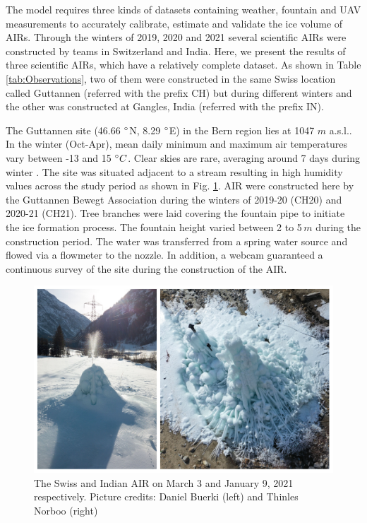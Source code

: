 \documentclass[utf8]{frontiersSCNS} %
\begin{document}
The model requires three kinds of datasets containing weather, fountain and UAV measurements to accurately calibrate,
estimate and validate the ice volume of AIRs. Through the winters of 2019, 2020 and 2021 several scientific AIRs were
constructed by teams in Switzerland and India. Here, we present the results of three scientific AIRs, which have a
relatively complete dataset. As shown in Table \ref{tab:Observations}, two of them were constructed in the same Swiss
location called Guttannen (referred with the prefix CH) but during different winters and the other was constructed at
Gangles, India (referred with the prefix IN).

The Guttannen site (46.66 $\degree$N, 8.29 $\degree$E) in the Bern region lies at 1047 $m$ a.s.l.. In the winter
(Oct-Apr), mean daily minimum and maximum air temperatures vary between -13 and 15 $\degree C$. Clear skies are rare,
averaging around 7 days during winter \citep{guttannen}. The site was situated adjacent to a stream resulting in high
humidity values across the study period as shown in Fig. \ref{fig:2AIR}. AIR were constructed here by the Guttannen
Bewegt Association during the winters of 2019-20 (CH20) and 2020-21 (CH21). Tree branches were laid covering the
fountain pipe to initiate the ice formation process. The fountain height varied between 2 to 5\,$m$ during the
construction period. The water was transferred from a spring water source and flowed via a flowmeter to the nozzle. In
addition, a webcam guaranteed a continuous survey of the site during the construction of the AIR.

\begin{figure}
	\begin{center}
		\includegraphics[width=12 cm]{Figures/Figure_2.jpg}
	\end{center}
	\caption{The Swiss and Indian AIR on March 3 and January 9, 2021 respectively. Picture credits: Daniel Buerki (left)
		and Thinles Norboo (right)}
	\label{fig:2AIR}
\end{figure}
\end{document}

